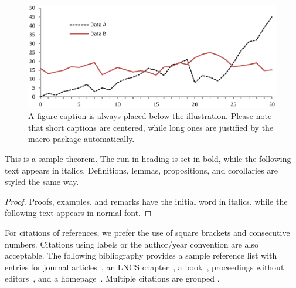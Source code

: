 \documentclass[runningheads]{llncs}
\begin{document}
\begin{figure}
\includegraphics[width=\textwidth]{fig1.eps}
\caption{A figure caption is always placed below the illustration.
Please note that short captions are centered, while long ones are
justified by the macro package automatically.} \label{fig1}
\end{figure}

\begin{theorem}
This is a sample theorem. The run-in heading is set in bold, while
the following text appears in italics. Definitions, lemmas,
propositions, and corollaries are styled the same way.
\end{theorem}
%
%
\begin{proof}
Proofs, examples, and remarks have the initial word in italics,
while the following text appears in normal font.
\end{proof}
For citations of references, we prefer the use of square brackets
and consecutive numbers. Citations using labels or the author/year
convention are also acceptable. The following bibliography provides
a sample reference list with entries for journal
articles~\cite{ref1}, an LNCS chapter~\cite{ref2}, a
book~\cite{ref1}, proceedings without editors~\cite{ref1},
and a homepage~\cite{ref_2}. Multiple citations are grouped
\cite{ref1,ref2}.
%
%
% 
% 
%


\end{document}
